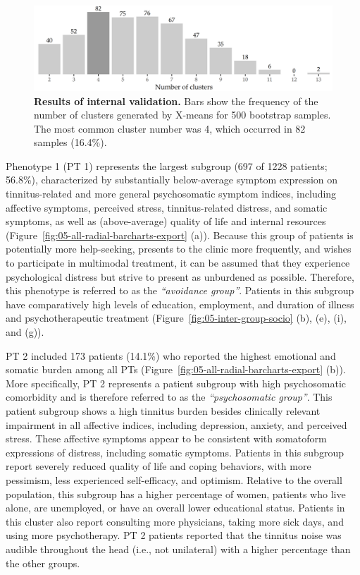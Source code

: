 \documentclass[
  oneside]{book}
\begin{document}
\begin{figure}[htb]

{\centering \includegraphics[width=1\linewidth]{figures/05-bootstrap-eval} 

}

\caption{\textbf{Results of internal validation.} Bars show the frequency of the number of clusters generated by X-means for 500 bootstrap samples. The most common cluster number was 4, which occurred in 82 samples (16.4\%).}\label{fig:05-bootstrap-eval}
\end{figure}

Phenotype 1 (PT 1) represents the largest subgroup (697 of 1228 patients; 56.8\%), characterized by substantially below-average symptom expression on tinnitus-related and more general psychosomatic symptom indices, including affective symptoms, perceived stress, tinnitus-related distress, and somatic symptoms, as well as (above-average) quality of life and internal resources (Figure~\ref{fig:05-all-radial-barcharts-export} (a)).
Because this group of patients is potentially more help-seeking, presents to the clinic more frequently, and wishes to participate in multimodal treatment, it can be assumed that they experience psychological distress but strive to present as unburdened as possible.
Therefore, this phenotype is referred to as the \emph{``avoidance group''}.
Patients in this subgroup have comparatively high levels of education, employment, and duration of illness and psychotherapeutic treatment (Figure~\ref{fig:05-inter-group-socio} (b), (e), (i), and (g)).

PT 2 included 173 patients (14.1\%) who reported the highest emotional and somatic burden among all PTs (Figure~\ref{fig:05-all-radial-barcharts-export} (b)).
More specifically, PT 2 represents a patient subgroup with high
psychosomatic comorbidity and is therefore referred to as the \emph{``psychosomatic group''}.
This patient subgroup shows a high tinnitus burden besides clinically relevant impairment in all affective indices, including depression, anxiety, and perceived stress.
These affective symptoms appear to be consistent with somatoform expressions of distress, including somatic symptoms.
Patients in this subgroup report severely reduced quality of life and coping behaviors, with more pessimism, less experienced self-efficacy, and optimism.
Relative to the overall population, this subgroup has a higher percentage of women, patients who live alone, are unemployed, or have an overall lower educational status.
Patients in this cluster also report consulting more physicians, taking more sick days, and using more psychotherapy.
PT 2 patients reported that the tinnitus noise was audible throughout the head (i.e., not unilateral) with a higher percentage than the other groups.
\end{document}
